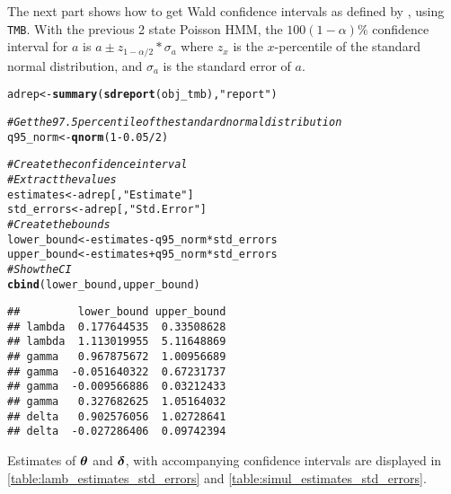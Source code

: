 \documentclass[bimj,fleqn]{w-art}\usepackage[]{graphicx}\usepackage[]{color}
\makeatletter
\newcommand{\hlnum}[1]{\textcolor[rgb]{0.686,0.059,0.569}{#1}}%
\newcommand{\hlstr}[1]{\textcolor[rgb]{0.192,0.494,0.8}{#1}}%
\newcommand{\hlcom}[1]{\textcolor[rgb]{0.678,0.584,0.686}{\textit{#1}}}%
\newcommand{\hlopt}[1]{\textcolor[rgb]{0,0,0}{#1}}%
\newcommand{\hlstd}[1]{\textcolor[rgb]{0.345,0.345,0.345}{#1}}%
\newcommand{\hlkwb}[1]{\textcolor[rgb]{0.69,0.353,0.396}{#1}}%
\newcommand{\hlkwd}[1]{\textcolor[rgb]{0.737,0.353,0.396}{\textbf{#1}}}%
\newenvironment{kframe}{%
 \def\at@end@of@kframe{}%
 \ifinner\ifhmode%
  \def\at@end@of@kframe{\end{minipage}}%
  \begin{minipage}{\columnwidth}%
 \fi\fi%
 \def\FrameCommand##1{\hskip\@totalleftmargin \hskip-\fboxsep
 \colorbox{shadecolor}{##1}\hskip-\fboxsep
     \hskip-\linewidth \hskip-\@totalleftmargin \hskip\columnwidth}%
 \MakeFramed {\advance\hsize-\width
   \@totalleftmargin\z@ \linewidth\hsize
   \@setminipage}}%
 {\par\unskip\endMakeFramed%
 \at@end@of@kframe}
\newenvironment{knitrout}{}{} %
\newcommand{\btheta}{\mbox{\boldmath $\theta$}}
\newcommand{\bfdelta}{\mbox{\boldmath $\delta$}}
\theoremstyle{plain}
\theoremstyle{definition}
\makeatother
\begin{document}
The next part shows how to get Wald confidence intervals as defined by \citet{wald}, using {\tt{TMB}}.
With the previous 2 state Poisson HMM, the $100(1-\alpha)\%$ confidence interval for $a$ is $a \pm z_{1-\alpha/2} * \sigma_{a}$ where $z_{x}$ is the $x$-percentile of the standard normal distribution, and $\sigma_a$ is the standard error of $a$.
\begin{knitrout}
\color{fgcolor}\begin{kframe}
\begin{alltt}
\hlstd{adrep} \hlkwb{<-} \hlkwd{summary}\hlstd{(}\hlkwd{sdreport}\hlstd{(obj_tmb),} \hlstr{"report"}\hlstd{)}

\hlcom{# Get the 97.5 percentile of the standard normal distribution}
\hlstd{q95_norm} \hlkwb{<-} \hlkwd{qnorm}\hlstd{(}\hlnum{1} \hlopt{-} \hlnum{0.05} \hlopt{/} \hlnum{2}\hlstd{)}

\hlcom{# Create the confidence interval}
\hlcom{# Extract the values}
\hlstd{estimates} \hlkwb{<-} \hlstd{adrep[,} \hlstr{"Estimate"}\hlstd{]}
\hlstd{std_errors} \hlkwb{<-} \hlstd{adrep[,} \hlstr{"Std. Error"}\hlstd{]}
\hlcom{# Create the bounds}
\hlstd{lower_bound} \hlkwb{<-} \hlstd{estimates} \hlopt{-} \hlstd{q95_norm} \hlopt{*} \hlstd{std_errors}
\hlstd{upper_bound} \hlkwb{<-} \hlstd{estimates} \hlopt{+} \hlstd{q95_norm} \hlopt{*} \hlstd{std_errors}
\hlcom{# Show the CI}
\hlkwd{cbind}\hlstd{(lower_bound, upper_bound)}
\end{alltt}
\begin{verbatim}
##         lower_bound upper_bound
## lambda  0.177644535  0.33508628
## lambda  1.113019955  5.11648869
## gamma   0.967875672  1.00956689
## gamma  -0.051640322  0.67231737
## gamma  -0.009566886  0.03212433
## gamma   0.327682625  1.05164032
## delta   0.902576056  1.02728641
## delta  -0.027286406  0.09742394
\end{verbatim}
\end{kframe}
\end{knitrout}

Estimates of $\btheta$ and $\bfdelta$, with accompanying confidence intervals are displayed in \autoref{table:lamb_estimates_std_errors} and \autoref{table:simul_estimates_std_errors}.
\end{document}
